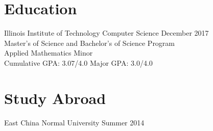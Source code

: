 \documentclass[margin=1in, 10pt]{res}
\begin{document}
\address{www.anthonyhicksiii.com \\ https://github.com/TheRealMingo}
\address{anthony@anthonyhicksiii.com}

\begin{resume}
\section{Education}
	Illinois Institute of Technology \hspace{53pt}
	{\centering Computer Science} 
	 \hfill December 2017 \\
	Master's of Science and Bachelor's of Science Program \\
	Applied Mathematics Minor \\
	Cumulative GPA: 3.07/4.0 \hfill
	Major GPA: 3.0/4.0 
\section{Study Abroad}
	East China Normal University \hfill Summer 2014  

\end{resume}
\end{document}
